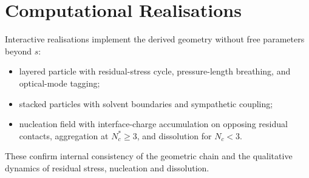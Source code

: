 \section{Computational Realisations}
\label{sec:computational}

Interactive realisations implement the derived geometry without free parameters
beyond $s$:
\begin{itemize}
\item layered particle with residual-stress cycle, pressure-length breathing, and
optical-mode tagging;
\item stacked particles with solvent boundaries and sympathetic coupling;
\item nucleation field with interface-charge accumulation on opposing residual
contacts, aggregation at $N_c^*\ge 3$, and dissolution for $N_c<3$.
\end{itemize}
These confirm internal consistency of the geometric chain and the qualitative
dynamics of residual stress, nucleation and dissolution.
